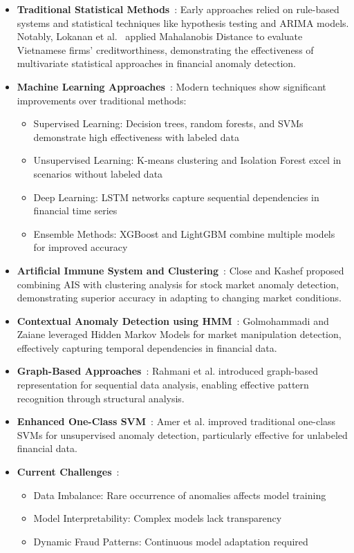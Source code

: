 \documentclass[conference]{IEEEtran}
\begin{document}
\begin{itemize}
    \item \textbf{Traditional Statistical Methods}~\cite{wang2024}: Early approaches relied on rule-based systems and statistical techniques like hypothesis testing and ARIMA models. Notably, Lokanan et al.~\cite{lokanan2019} applied Mahalanobis Distance to evaluate Vietnamese firms' creditworthiness, demonstrating the effectiveness of multivariate statistical approaches in financial anomaly detection.

    \item \textbf{Machine Learning Approaches}~\cite{li2024}: Modern techniques show significant improvements over traditional methods:
    \begin{itemize}
        \item Supervised Learning: Decision trees, random forests, and SVMs demonstrate high effectiveness with labeled data
        \item Unsupervised Learning: K-means clustering and Isolation Forest excel in scenarios without labeled data
        \item Deep Learning: LSTM networks capture sequential dependencies in financial time series
        \item Ensemble Methods: XGBoost and LightGBM combine multiple models for improved accuracy
    \end{itemize}

    \item \textbf{Artificial Immune System and Clustering}~\cite{close2020}: Close and Kashef proposed combining AIS with clustering analysis for stock market anomaly detection, demonstrating superior accuracy in adapting to changing market conditions.

    \item \textbf{Contextual Anomaly Detection using HMM}~\cite{golmohammadi2015}: Golmohammadi and Zaiane leveraged Hidden Markov Models for market manipulation detection, effectively capturing temporal dependencies in financial data.

    \item \textbf{Graph-Based Approaches}~\cite{rahmani2014}: Rahmani et al. introduced graph-based representation for sequential data analysis, enabling effective pattern recognition through structural analysis.

    \item \textbf{Enhanced One-Class SVM}~\cite{amer2013}: Amer et al. improved traditional one-class SVMs for unsupervised anomaly detection, particularly effective for unlabeled financial data.

    \item \textbf{Current Challenges}~\cite{wang2024, li2024}:
    \begin{itemize}
        \item Data Imbalance: Rare occurrence of anomalies affects model training
        \item Model Interpretability: Complex models lack transparency
        \item Dynamic Fraud Patterns: Continuous model adaptation required
    \end{itemize}
\end{itemize}
\end{document}
